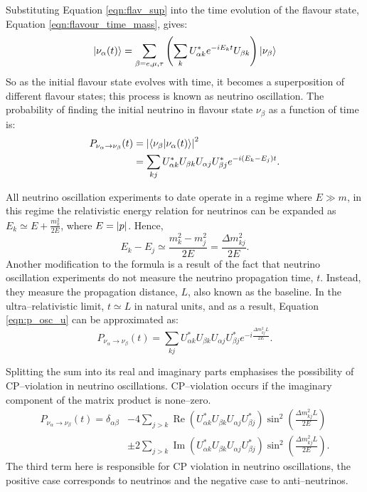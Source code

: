 Substituting Equation \ref{eqn:flav_sup} into the time evolution of the flavour
state, Equation \ref{eqn:flavour_time_mass}, gives:
\begin{equation*}
	\ket{\nu_\alpha(t)} = \sum_{\beta = e, \mu, \tau} \left(\sum_k
	U^*_{\alpha k} e^{-iE_kt} U_{\beta k} \right) \ket{\nu_{\beta}} 
\end{equation*}
So as the initial flavour state evolves with time, it becomes a superposition 
of different flavour states; this process is known as neutrino oscillation.
The probability of finding the initial neutrino in flavour state \(\nu_\beta\) 
as a function of time is:
\begin{align}
	\label{eqn:p_osc_u}
	P_{\nu_\alpha \rightarrow \nu_\beta}(t) &= \abs{\braket{\nu_\beta}{\nu_\alpha(t)}}^2 \nonumber \\
	                                        &= \sum_{kj} U^*_{\alpha k} U_{\beta k} U_{\alpha j} U^*_{\beta j} e^{-i(E_k - E_j)t}.
\end{align}

All neutrino oscillation experiments to date operate in a regime where 
\(E \gg m\), in this regime the relativistic energy relation for neutrinos can 
be expanded as \({E_k \simeq E + \frac{m_k^2}{2E}}\), where \(E = \abs{p}\). 
Hence, 
\begin{equation*}
	E_k - E_j \simeq \frac{m_k^2 - m_j^2}{2E} = \frac{\Delta m_{kj}^2}{2E}.
\end{equation*}
Another modification to the formula is a result of the fact that neutrino 
oscillation experiments do not measure the neutrino propagation time, \(t\). 
Instead, they measure the propagation distance, \(L\), also known as the 
baseline. In the ultra--relativistic limit, \({t \simeq L}\) in natural units,
and as a result, Equation \ref{eqn:p_osc_u} can be approximated as:
\begin{equation*}
	P_{\nu_\alpha \rightarrow \nu_\beta}(t) = \sum_{kj} U^*_{\alpha k} U_{\beta k} U_{\alpha j} U^*_{\beta j} e^{-i\frac{\Delta m^2_{kj}L}{2E}}.
\end{equation*}

Splitting the sum into its real and imaginary parts emphasises the possibility
of CP--violation in neutrino oscillations. CP--violation occurs if the imaginary
component of the matrix product is none--zero. 
\begin{align*}
	P_{\nu_\alpha \rightarrow \nu_\beta}(t) = \delta_{\alpha \beta} 
	&- 4 \sum_{j > k} \operatorname{Re}(U^*_{\alpha k} U_{\beta k} U_{\alpha j} U^*_{\beta j}) \sin^2(\frac{\Delta m^2_{kj} L}{2E}) \nonumber \\
	&\pm 2 \sum_{j > k} \operatorname{Im}(U^*_{\alpha k} U_{\beta k} U_{\alpha j} U^*_{\beta j}) \sin^2(\frac{\Delta m^2_{kj} L}{2E}).
\end{align*}
The third term here is responsible for CP violation in neutrino oscillations,
the positive case corresponds to neutrinos and the negative case to
anti--neutrinos.

